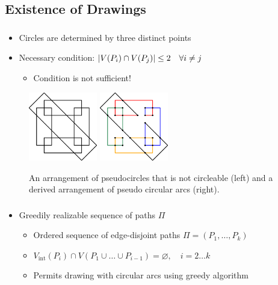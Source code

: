 \subsection{Existence of Drawings}
\label{subsect:application-existence-of-drawings}

\begin{frame}
  \frametitle{\insertsubsection}
  \begin{itemize}
    \item Circles are determined by three distinct points
    \item Necessary condition: ${\left\lvert V(P_i) \cap V(P_j)\right\rvert \leq 2 \quad \forall i \neq j}$ \begin{itemize}
      \item Condition is not sufficient!
    \end{itemize}
  \end{itemize}
  \begin{figure}
    \includegraphics[height=3cm]{Resources/Arrangement-of-Pseudocircles}
    \quad
    \includegraphics[height=3cm]{Resources/Arrangement-of-Pseudoarcs}
    \caption{An arrangement of pseudocircles that is not circleable (left) and a derived arrangement of pseudo circular arcs (right).}
  \end{figure}
\end{frame}

\begin{frame}
  \frametitle{\insertsubsection}
  \begin{itemize}
    \item Greedily realizable sequence of paths ${\Pi}$ \begin{itemize}
      \item Ordered sequence of edge-disjoint paths ${\Pi = (P_1, \ldots, P_k)}$
      \item ${V_\text{int}(P_i) \cap V(P_1 \cup \ldots \cup P_{i-1}) \stackrel{}{=} \varnothing, \quad i = 2 \ldots k}$
      \item Permits drawing with circular arcs using greedy algorithm
    \end{itemize}
  \end{itemize}
\end{frame}

